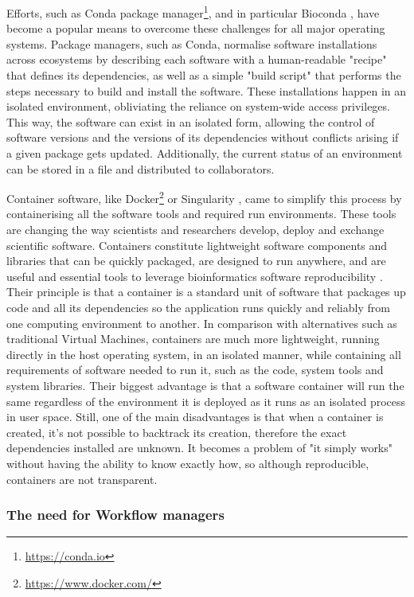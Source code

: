 Efforts, such as Conda package manager\footnote{\url{https://conda.io}}, and in particular Bioconda \citep{gruning_bioconda_2018}, have become a popular means to overcome these challenges for all major operating systems. Package managers, such as Conda, normalise software installations across ecosystems by describing each software with a human-readable "recipe" that defines its dependencies, as well as a simple "build script" that performs the steps necessary to build and install the software. These installations happen in an isolated environment, obliviating the reliance on system-wide access privileges. This way, the software can exist in an isolated form, allowing the control of software versions and the versions of its dependencies without conflicts arising if a given package gets updated. Additionally, the current status of an environment can be stored in a file and distributed to collaborators. 

Container software, like Docker\footnote{\url{https://www.docker.com/}} or Singularity \citep{kurtzer_singularity_2017}, came to simplify this process by containerising all the software tools and required run environments. These tools are changing the way scientists and researchers develop, deploy and exchange scientific software. Containers constitute lightweight software components and libraries that can be quickly packaged, are designed to run anywhere, and are useful and essential tools to leverage bioinformatics software reproducibility \citep{boettiger_introduction_2015,gruening_recommendations_2019}. Their principle is that a container is a standard unit of software that packages up code and all its dependencies so the application runs quickly and reliably from one computing environment to another. In comparison with alternatives such as traditional Virtual Machines, containers are much more lightweight, running directly in the host operating system, in an isolated manner, while containing all requirements of software needed to run it, such as the code, system tools and system libraries. Their biggest advantage is that a software container will run the same regardless of the environment it is deployed as it runs as an isolated process in user space. Still, one of the main disadvantages is that when a container is created, it's not possible to backtrack its creation, therefore the exact dependencies installed are unknown. It becomes a problem of "it simply works" without having the ability to know exactly how, so although reproducible, containers are not transparent. 

\subsubsection{The need for Workflow managers}

